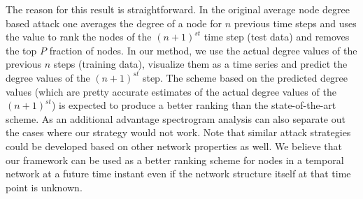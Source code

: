 The reason for this result is straightforward. In the original average node degree based attack one averages 
the degree of a node for $n$ previous time steps and uses the value to rank the nodes of the $(n+1)^{st}$ time step (test data) and removes the top $P$ fraction of nodes. 
In our method, we use the actual degree values of the previous $n$ steps (training data), visualize them as a time series and predict the degree values of the $(n+1)^{st}$ step. The scheme based on 
the predicted degree values (which are pretty accurate estimates of the actual degree values of the $(n+1)^{st}$) is expected to produce a better ranking than the state-of-the-art 
scheme. As an additional advantage spectrogram analysis can also separate out the cases where our strategy would not work. 
Note that similar attack strategies could be developed based on other network properties as well.
We believe that our framework can be used as a better ranking scheme for nodes in a temporal network at a future time instant even if the network structure itself at that time point 
is unknown.
\fi


